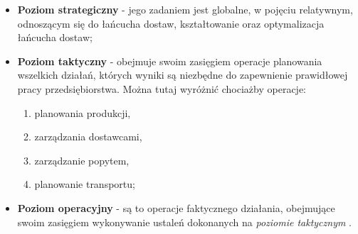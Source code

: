 		\begin{itemize}
			\item \textbf{Poziom strategiczny} 	- jego zadaniem jest globalne,
			w pojęciu relatywnym, odnoszącym się do łańcucha dostaw, kształtowanie oraz optymalizacja
			łańcucha dostaw;
			\item \textbf{Poziom taktyczny}		- obejmuje swoim zasięgiem operacje planowania wszelkich działań, 
			których	wyniki są niezbędne do zapewnienie prawidłowej pracy przedsiębiorstwa. Można tutaj wyróżnić 
			chociażby operacje:
			\begin{enumerate}
				\item planowania produkcji,
				\item zarządzania dostawcami,
				\item zarządzanie popytem,
				\item planowanie transportu;
			\end{enumerate}
			\item \textbf{Poziom operacyjny} 	- są to operacje faktycznego działania, obejmujące swoim zasięgiem
			wykonywanie ustaleń dokonanych na \emph{poziomie taktycznym} \cite{ewolucja_lancuchow_dostaw_cz1}.
		\end{itemize}